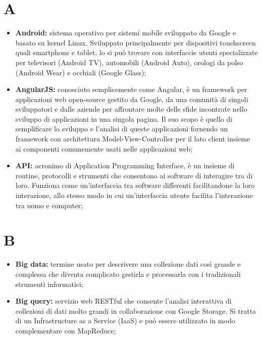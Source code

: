 %


\section*{A} %
\label{sec:a}
	\begin{itemize}
		\item \textbf{Android:} sistema operativo per sistemi mobile sviluppato da Google e basato su kernel Linux. Sviluppato principalmente per dispositivi touchscreen quali smartphone e tablet, lo si può trovare con interfaccie utenti specializzate per televisori (Android TV), automobili (Android Auto), orologi da polso (Android Wear) e occhiali (Google Glass);
		\item \textbf{AngularJS:} conosciuto semplicemente come Angular, è un framework per applicazioni web open-source gestito da Google, da una comunità di singoli sviluppatori e dalle aziende per affrontare molte delle sfide incontrate nello sviluppo di applicazioni in una singola pagina. Il suo scopo è quello di semplificare lo sviluppo e l'analisi di queste applicazioni fornendo un framework con architettura Model-View-Controller per il lato client insieme ai componenti comunemente usati nelle applicazioni web;
		\item \textbf{API:} acronimo di Application Programming Interface, è un insieme di routine, protocolli e strumenti che consentono ai software di interagire tra di loro. Funziona come un'interfaccia tra software differenti facilitandone la loro interazione, allo stesso modo in cui un'interfaccia utente facilita l'interazione tra uomo e computer;
	\end{itemize}
\pagebreak

\section*{B} %
\label{sec:b}
	\begin{itemize}
		\item \textbf{Big data:} termine usato per descrivere una collezione dati così grande e complessa che diventa complicato gestirla e processarla con i tradizionali strumenti informatici;
		\item \textbf{Big query:} servizio web RESTful che consente l'analisi interattiva di collezioni di dati molto grandi in collaborazione con Google Storage. Si tratta di un Infrastructure as a Service (IaaS) e può essere utilizzato in modo complementare con MapReduce;  
	\end{itemize}
\pagebreak

